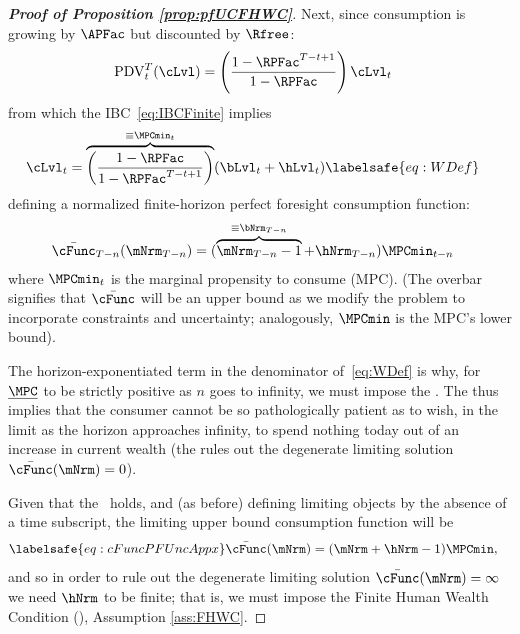 \documentclass[\econtexRoot/BufferStockTheory]{subfiles}
\begin{document}
\begin{proof}[\textbf{Proof of Proposition \ref{prop:pfUCFHWC}}]
Next, since consumption is growing by $\APFac$ but discounted by $\Rfree$:
\begin{align*}
  \mathrm{PDV}_{t}^{T}(\cLvl)  & = \left(\frac{1-\RPFac^{T-t+1}}{1-\RPFac}\right)\cLvl_{t}
\end{align*}
from which the IBC~\eqref{eq:IBCFinite} implies
\begin{equation}\begin{gathered}\begin{aligned}
  \cLvl_{t}  & = \overbrace{\left(\frac{1-\RPFac}{1-\RPFac^{T-t+1}}\right)}^{\equiv \MPCmin_{t}}
               (\bLvl_{t}+\hLvl_{t})   \labelsafe{eq:WDef}
\end{aligned}\end{gathered}\end{equation}
defining a normalized finite-horizon perfect foresight consumption function:\hypertarget{MPCminDefn}{}
%
%
\begin{align*}
  \bar{\cFunc}_{T-n}(\mNrm_{T-n})  & = (\overbrace{\mNrm_{T-n}-1}^{
                                     \equiv\bNrm_{T-n}}+\hNrm_{T-n})\MPCmin_{t-n}
\end{align*}
%
%
where $\MPCmin_{t}$ is the marginal propensity to consume (MPC).
(The overbar signifies that $\bar{\cFunc}$ will be an upper bound as we modify the problem to incorporate constraints and uncertainty; analogously, $\MPCmin$ is the MPC's lower bound).


The horizon-exponentiated term in the denominator of~\eqref{eq:WDef} is why, for $\underline{\MPC}$ to be strictly positive as $n$ goes to infinity, we must impose the {\RIC}.
The {\RIC} thus implies that the consumer cannot be so pathologically patient as to wish, in the limit as the horizon approaches infinity, to spend nothing today out of an increase in current wealth (the {\RIC} rules out the degenerate limiting solution $\bar{\cFunc}(\mNrm)=0$).



\hypertarget{Unconstrained-Solution}{}\hypertarget{PF-Unconstrained-Solution}{}

Given that the {\RIC}~holds, and (as before) defining limiting objects by the absence of a time subscript, the limiting upper bound consumption function will be
\begin{equation}\begin{gathered}\begin{aligned}\labelsafe{eq:cFuncPFUncAppx}
  \bar{\cFunc}(\mNrm)  & = (\mNrm+\hNrm-1)\MPCmin,
\end{aligned}\end{gathered}\end{equation}
and so in order to rule out the degenerate limiting solution $\bar{\cFunc}(\mNrm) = \infty$ we need $\hNrm$ to be finite; that is, we must impose the Finite Human Wealth Condition ({\FHWC}), Assumption \eqref{ass:FHWC}.


\end{proof}
\end{document}
